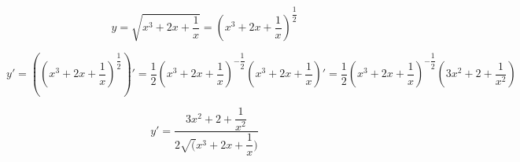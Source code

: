 {}

$$
  y = \sqrt{x^3+2x+\dfrac{1}{x}} = (x^3+2x+\dfrac{1}{x})^{\dfrac{1}{2}}
$$

$$
  y' = ((x^3+2x+\dfrac{1}{x})^{\dfrac{1}{2}})'
     =  \dfrac{1}{2}(x^3+2x+\dfrac{1}{x})^{-\dfrac{1}{2}}(x^3+2x+\dfrac{1}{x})'
     =  \dfrac{1}{2}(x^3+2x+\dfrac{1}{x})^{-\dfrac{1}{2}}(3x^2+2+\dfrac{1}{x^2})
$$

$$
  y' = \dfrac{3x^2+2+\dfrac{1}{x^2}}{2\sqrt(x^3+2x+\dfrac{1}{x})}
$$
